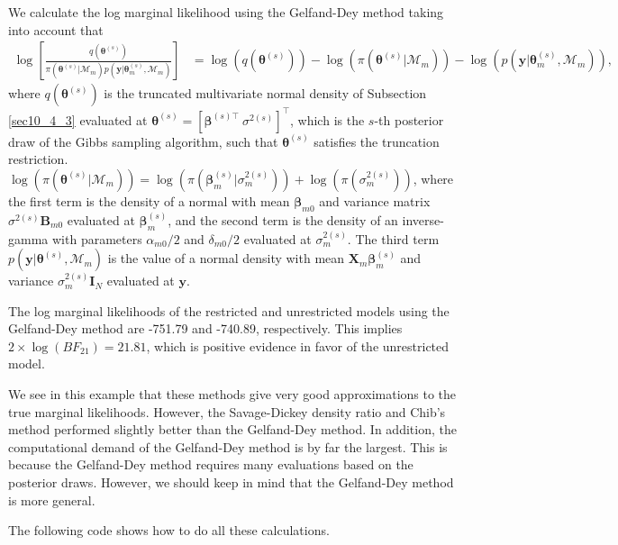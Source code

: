 We calculate the log marginal likelihood using the Gelfand-Dey method taking into account that
\begin{align*}
	\log\left[\frac{q(\bm{\theta}^{(s)})}{\pi(\bm{\theta}^{(s)}|\mathcal{M}_m)p(\bm{y}|\bm{\theta}^{(s)}_m,\mathcal{M}_m)}\right]&=\log(q(\bm{\theta}^{(s)}))-\log(\pi(\bm{\theta}^{(s)}|\mathcal{M}_m))-\log(p(\bm{y}|\bm{\theta}^{(s)}_m,\mathcal{M}_m)),
\end{align*}
where $q(\bm{\theta}^{(s)})$ is the truncated multivariate normal density of Subsection \ref{sec10_4_3} evaluated at $\bm{\theta}^{(s)}=[\bm{\beta}^{(s)\top} \ \sigma^{2(s)}]^{\top}$, which is the $s$-th posterior draw of the Gibbs sampling algorithm, such that $\bm{\theta}^{(s)}$ satisfies the truncation restriction. $\log(\pi(\bm{\theta}^{(s)}|\mathcal{M}_m))=\log(\pi(\bm{\beta}_m^{(s)}|\sigma^{2(s)}_m))+\log(\pi(\sigma^{2(s)}_m))$, where the first term is the density of a normal with mean $\bm{\beta}_{m0}$ and variance matrix $\sigma^{2(s)}\bm{B}_{m0}$ evaluated at $\bm{\beta}_m^{(s)}$, and the second term is the density of an inverse-gamma with parameters $\alpha_{m0}/2$ and $\delta_{m0}/2$ evaluated at $\sigma^{2(s)}_m$. The third term $p(\bm{y}|\bm{\theta}^{(s)},\mathcal{M}_m)$ is the value of a normal density with mean $\bm{X}_m\bm{\beta}_{m}^{(s)}$ and variance $\sigma^{2(s)}_m\bm{I}_N$ evaluated at $\bm{y}$.

The log marginal likelihoods of the restricted and unrestricted models using the Gelfand-Dey method are -751.79 and -740.89, respectively. This implies $2\times \log(BF_{21})=21.81$, which is positive evidence in favor of the unrestricted model.

We see in this example that these methods give very good approximations to the true marginal likelihoods. However, the Savage-Dickey density ratio and Chib's method performed slightly better than the Gelfand-Dey method. In addition, the computational demand of the Gelfand-Dey method is by far the largest. This is because the Gelfand-Dey method requires many evaluations based on the posterior draws. However, we should keep in mind that the Gelfand-Dey method is more general.

The following code shows how to do all these calculations.

